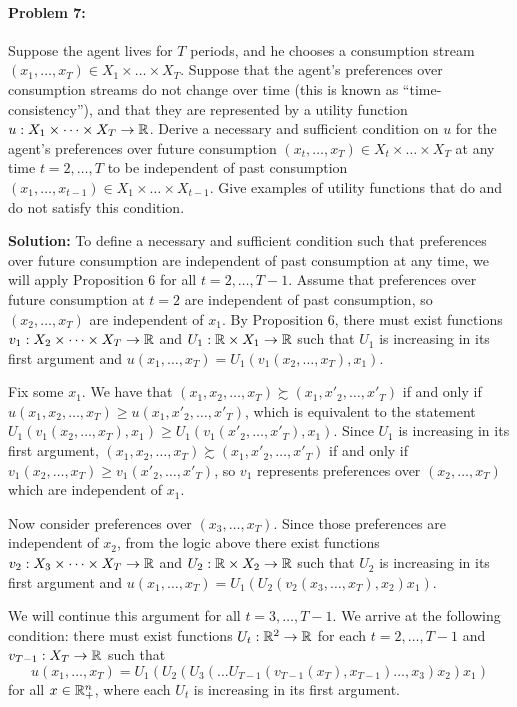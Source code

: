 \documentclass[12pt]{article}
\begin{document}
\paragraph{Problem 7:} Suppose the agent lives for $T$ periods, and he chooses a consumption stream $(x_1,\dots,x_T) \in X_1 \times \dots \times X_T$. Suppose that the agent's preferences over consumption streams do not change over time (this is known as ``time-consistency''), and that they are represented by a utility function $u : X_1 \times \dots \times X_T \to \mathbb{R}$. Derive a necessary and sufficient condition on $u$ for the agent's preferences over future consumption $(x_t,\dots,x_T) \in X_t \times \dots \times X_T$ at any time $t = 2,\dots,T$ to be independent of past consumption $(x_1,\dots,x_{t-1}) \in X_1 \times \dots \times X_{t-1}$. Give examples of utility functions that do and do not satisfy this condition.

\medskip

\textbf{Solution:} To define a necessary and sufficient condition such that preferences over future consumption are independent of past consumption at any time, we will apply Proposition 6 for all $t = 2,\dots,T-1$. Assume that preferences over future consumption at $t = 2$ are independent of past consumption, so $(x_2,\dots,x_T)$ are independent of $x_1$. By Proposition 6, there must exist functions $v_1 : X_2 \times \cdots \times X_T \to \mathbb{R}$ and $U_1 : \mathbb{R} \times X_1 \to \mathbb{R}$ such that $U_1$ is increasing in its first argument and $u(x_1,\dots,x_T) = U_1(v_1(x_2,\dots,x_T),x_1)$. 

Fix some $x_1$. We have that $(x_1,x_2,\dots,x_T) \succsim (x_1,x'_2,\dots,x'_T)$ if and only if $u(x_1,x_2,\dots,x_T) \ge u(x_1,x'_2,\dots,x'_T)$, which is equivalent to the statement $U_1(v_1(x_2,\dots,x_T),x_1) \ge U_1(v_1(x'_2,\dots,x'_T),x_1)$. Since $U_1$ is increasing in its first argument, $(x_1,x_2,\dots,x_T) \succsim (x_1,x'_2,\dots,x'_T)$ if and only if $v_1(x_2,\dots,x_T) \ge v_1(x'_2,\dots,x'_T)$, so $v_1$ represents preferences over $(x_2,\dots,x_T)$ which are independent of $x_1$.

Now consider preferences over $(x_3,\dots,x_T)$. Since those preferences are independent of $x_2$, from the logic above there exist functions $v_2 : X_3 \times \cdots \times X_T \to \mathbb{R}$ and $U_2 : \mathbb{R} \times X_2 \to \mathbb{R}$ such that $U_2$ is increasing in its first argument and $u(x_1,\dots,x_T) = U_1(U_2(v_2(x_3,\dots,x_T),x_2)x_1)$.

We will continue this argument for all $t = 3,\dots,T-1$. We arrive at the following condition: there must exist functions $U_t : \mathbb{R}^2 \to \mathbb{R}$ for each $t = 2,\dots,T-1$ and $v_{T-1} : X_T \to \mathbb{R}$ such that
\[
u(x_1,\dots,x_T) = U_1(U_2(U_3(\dots U_{T-1}(v_{T-1}(x_T),x_{T-1}) \dots,x_3)x_2)x_1)
\]
for all $x \in \mathbb{R}^n_+$, where each $U_t$ is increasing in its first argument.
\end{document}
